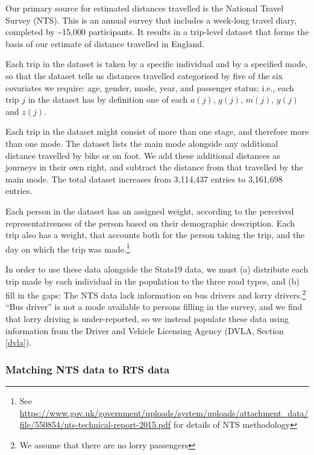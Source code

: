 \documentclass{article}
\begin{document}
Our primary source for estimated distances travelled is the National Travel Survey (NTS). This is an annual survey that includes a week-long travel diary, completed by \textasciitilde 15,000 participants. It results in a trip-level dataset that forms the basis of our estimate of distance travelled in England.

Each trip in the dataset is taken by a specific individual and by a specified mode, so that the dataset tells us distances travelled categorised by five of the six covariates we require: age, gender, mode, year, and passenger status; i.e., each trip $j$ in the dataset has by definition one of each $a(j)$, $g(j)$, $m(j)$, $y(j)$ and $z(j)$. 

Each trip in the dataset might consist of more than one stage, and therefore more than one mode. The dataset lists the main mode alongside any additional distance travelled by bike or on foot. We add these additional distances as journeys in their own right, and subtract the distance from that travelled by the main mode. The total dataset increases from 3,114,437 entries to 3,161,698 entries.

Each person in the dataset has an assigned weight, according to the perceived representativeness of the person based on their demographic description. Each trip also has a weight, that accounts both for the person taking the trip, and the day on which the trip was made.\footnote{See \url{https://www.gov.uk/government/uploads/system/uploads/attachment_data/file/550854/nts-technical-report-2015.pdf} for details of NTS methodology}

In order to use these data alongside the Stats19 data, we must (a) distribute each trip made by each individual in the population to the three road types, and (b) fill in the gaps: The NTS data lack information on bus drivers and lorry drivers.\footnote{We assume that there are no lorry passengers} ``Bus driver'' is not a mode available to persons filling in the survey, and we find that lorry driving is under-reported, so we instead populate these data using information from the Driver and Vehicle Licensing Agency (DVLA, Section \ref{dvla}).

\subsubsection{Matching NTS data to RTS data}\label{match}
\end{document}
